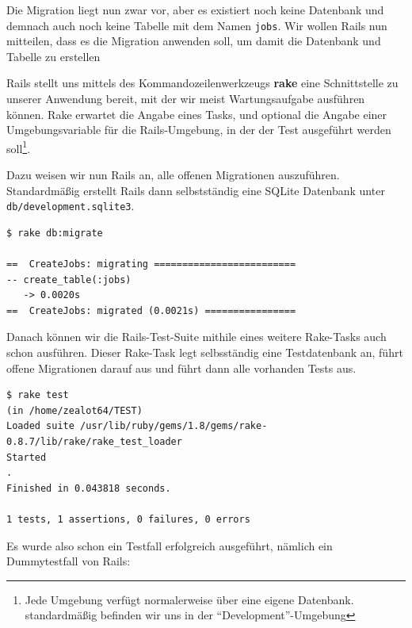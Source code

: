 Die Migration liegt nun zwar vor, aber es existiert noch keine Datenbank und demnach auch noch keine Tabelle mit dem Namen \texttt{jobs}. 
Wir wollen Rails nun mitteilen, dass es die Migration anwenden soll, um damit die Datenbank und Tabelle zu erstellen

Rails stellt uns mittels des Kommandozeilenwerkzeugs \textbf{rake} eine Schnittstelle zu unserer Anwendung bereit, mit der wir meist Wartungsaufgabe ausführen können. Rake erwartet die Angabe eines Tasks, und optional die Angabe einer Umgebungsvariable für die Rails-Umgebung, in der der Test ausgeführt werden soll\footnote{Jede Umgebung verfügt normalerweise über eine eigene Datenbank. standardmäßig befinden wir uns in der "`Development"'-Umgebung}.


Dazu weisen wir nun Rails an, alle offenen Migrationen auszuführen. Standardmäßig erstellt Rails dann selbstständig eine SQLite Datenbank unter \texttt{db/development.sqlite3}.


\begin{lstlisting}
$ rake db:migrate 
 
==  CreateJobs: migrating =========================
-- create_table(:jobs)
   -> 0.0020s
==  CreateJobs: migrated (0.0021s) ================
\end{lstlisting}

Danach können wir die Rails-Test-Suite mithile eines weitere Rake-Tasks auch schon ausführen. Dieser Rake-Task legt selbsständig eine Testdatenbank an, führt offene Migrationen darauf aus und führt dann alle vorhanden Tests aus.

\begin{lstlisting}
$ rake test
(in /home/zealot64/TEST)
Loaded suite /usr/lib/ruby/gems/1.8/gems/rake-0.8.7/lib/rake/rake_test_loader
Started
.
Finished in 0.043818 seconds.

1 tests, 1 assertions, 0 failures, 0 errors
\end{lstlisting}

Es wurde also schon ein Testfall erfolgreich ausgeführt, nämlich ein Dummytestfall von Rails:

\begin{ruby}[label={test/units/job\_test.rb}]
 

   
    
     
\end{ruby}
\label{list:bla}


